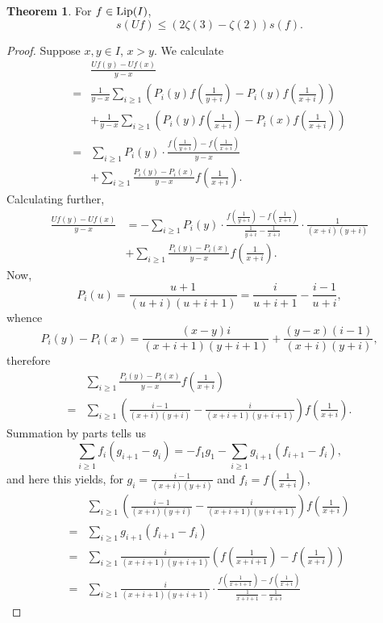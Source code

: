 \documentclass{article}
\newcommand{\Lip}{\ensuremath\mathrm{Lip}}
\theoremstyle{definition}
\newtheorem{theorem}{Theorem}
\theoremstyle{definition}
\begin{document}
\begin{theorem}
For $f \in \Lip(I)$,
\[
s(Uf) \leq (2\zeta(3)-\zeta(2)) s(f).
\]
\end{theorem}
\begin{proof}
Suppose $x,y \in I$, $x > y$. We calculate
\[
\begin{split}
&\frac{Uf(y)-Uf(x)}{y-x}\\
=&\frac{1}{y-x} \sum_{i \geq 1} \left(P_i(y) f\left(\frac{1}{y+i}\right) -P_i(y) f\left(\frac{1}{x+i}\right)\right)\\
& +\frac{1}{y-x} \sum_{i \geq 1} \left( P_i(y) f\left(\frac{1}{x+i}\right) -  P_i(x) f\left(\frac{1}{x+i}\right)\right)\\
=&\sum_{i \geq 1} P_i(y) \cdot \frac{f\left(\frac{1}{y+i}\right) - f\left(\frac{1}{x+i} \right)}{y-x}\\
&+\sum_{i \geq 1} \frac{P_i(y)-P_i(x)}{y-x} f\left(\frac{1}{x+i}\right).
\end{split}
\]
Calculating further,
\begin{align*}
\frac{Uf(y)-Uf(x)}{y-x}&=-\sum_{i \geq 1} P_i(y) \cdot \frac{f\left(\frac{1}{y+i}\right) - f\left(\frac{1}{x+i} \right)}{\frac{1}{y+i}-\frac{1}{x+i}}
\cdot \frac{1}{(x+i)(y+i)}\\
&+\sum_{i \geq 1} \frac{P_i(y)-P_i(x)}{y-x} f\left(\frac{1}{x+i}\right).
\end{align*}
Now, 
\[
P_i(u) =\frac{u+1}{(u+i)(u+i+1)}= \frac{i}{u+i+1}-\frac{i-1}{u+i},
\]
whence 
\[
P_i(y)-P_i(x)=\frac{(x-y)i}{(x+i+1)(y+i+1)} + \frac{(y-x)(i-1)}{(x+i)(y+i)},
\]
therefore
\[
\begin{split}
&\sum_{i \geq 1} \frac{P_i(y)-P_i(x)}{y-x} f\left(\frac{1}{x+i}\right)\\
=&\sum_{i \geq 1} \left(\frac{i-1}{(x+i)(y+i)}
-\frac{i}{(x+i+1)(y+i+1)}\right)f\left(\frac{1}{x+i}\right).
\end{split}
\]
Summation by parts tells us
\[
\sum_{i \geq 1} f_i(g_{i+1}-g_i) = - f_1 g_1 - \sum_{i \geq 1} g_{i+1}(f_{i+1}-f_i),
\]
and here this yields, for $g_i=\frac{i-1}{(x+i)(y+i)}$ and $f_i = f\left(\frac{1}{x+i}\right)$,
\[
\begin{split}
&\sum_{i \geq 1} \left(\frac{i-1}{(x+i)(y+i)}
-\frac{i}{(x+i+1)(y+i+1)}\right)f\left(\frac{1}{x+i}\right)\\
=&\sum_{i \geq 1} g_{i+1}(f_{i+1}-f_i)\\
=&\sum_{i \geq 1} \frac{i}{(x+i+1)(y+i+1)} \left( f \left(\frac{1}{x+i+1}\right) - f \left( \frac{1}{x+i} \right) \right)\\
=&\sum_{i \geq 1} \frac{i}{(x+i+1)(y+i+1)} \cdot \frac{ f \left(\frac{1}{x+i+1}\right) - f \left( \frac{1}{x+i} \right)}{\frac{1}{x+i+1}-\frac{1}{x+i}}

\end{split}\]
\end{proof}
\end{document}
